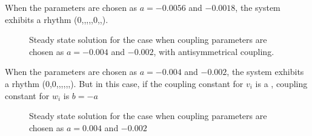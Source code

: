 When the parameters are chosen as $a = -0.0056$ and $-0.0018$, the system exhibits a rhythm (0,,,,,0,,). 


\begin{figure}[h]	
\centering

 




\label{fig:gait4}
\caption{Steady state solution for the case when coupling parameters are chosen as $a = -0.004$ and $-0.002$, with antisymmetrical coupling.}
\end{figure}


When the parameters are chosen as $a = -0.004$ and $-0.002$, the system exhibits a rhythm (0,0,,,,,,). But in this case, if the coupling constant for $v_i$ is a , coupling constant for $w_i$ is $b=-a$ 

\begin{figure}[h]	
\centering

 


\label{fig:gait5}
\caption{Steady state solution for the case when coupling parameters are chosen as $a = 0.004$ and $-0.002$}
\end{figure}

